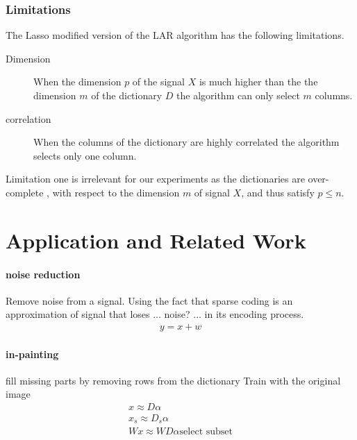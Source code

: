 \subsubsection{Limitations}
The Lasso modified version of the LAR algorithm has the following limitations.
\begin{description}
 \item[Dimension] When the dimension $p$ of the signal $X$ is 
much higher than the the dimension $m$ of the dictionary $D$ the algorithm can only select $m$ columns.

\item[correlation] When the columns of the dictionary are highly correlated the algorithm
selects only one column.
\end{description}

Limitation one is irrelevant for our experiments as the dictionaries are over-complete 
, with respect to the dimension $m$ of signal $X$, and thus satisfy $p\leq n$.

\section{Application and Related Work}

\paragraph{noise reduction}
Remove noise from a signal. 
Using the fact that sparse coding is an approximation of signal that loses ... noise? ... in its encoding process. 
\begin{align*}
y = x + w
\end{align*}



\cite{Elad2006}

\paragraph{in-painting}
fill missing parts by removing rows from the dictionary
Train with the original image
\begin{align*}
x \approx D\alpha\\
x_s \approx D_s\alpha\\
Wx \approx WD\alpha\text{select subset}\\
\end{align*}

\cite{mairal08sparse}

